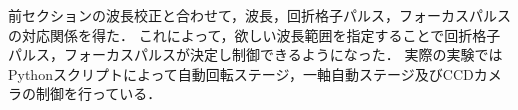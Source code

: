 
前セクションの波長校正と合わせて，波長，回折格子パルス，フォーカスパルスの対応関係を得た．
これによって，欲しい波長範囲を指定することで回折格子パルス，フォーカスパルスが決定し制御できるようになった．
実際の実験ではPythonスクリプトによって自動回転ステージ，一軸自動ステージ及びCCDカメラの制御を行っている．
